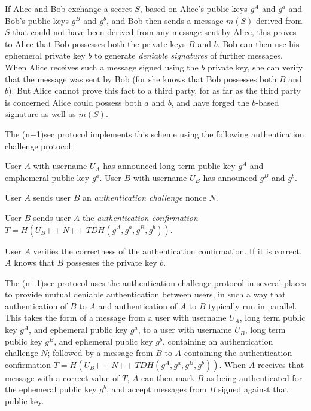 \documentclass{article}
\def\concat{\mathbin{+\!\!\!+}}
\begin{document}
If Alice and Bob exchange a secret $S$, based on Alice's public keys $g^A$ and $g^a$ and Bob's public keys $g^B$ and $g^b$, and Bob then sends a message $m(S)$ derived from $S$ that could not have been derived from any message sent by Alice, this proves to Alice that Bob possesses both the private keys $B$ and $b$.
Bob can then use his ephemeral private key $b$ to generate \emph{deniable signatures} of further messages.
When Alice receives such a message signed using the $b$ private key, she can verify that the message was sent by Bob (for she knows that Bob possesses both $B$ and $b$).
But Alice cannot prove this fact to a third party, for as far as the third party is concerned Alice could possess both $a$ and $b$, and have forged the $b$-based signature as well as $m(S)$.

The (n+1)sec protocol implements this scheme using the following authentication challenge protocol:
\begin{description}[noitemsep]
\item[Participants.] User $A$ with username $U_A$ has announced long term public key $g^A$ and emphemeral public key $g^a$. User $B$ with username $U_B$ has announced $g^B$ and $g^b$.
\item[Round 1.] User $A$ sends user $B$ an \emph{authentication challenge} nonce $N$.
\item[Round 2.] User $B$ sends user $A$ the \emph{authentication confirmation} $T = H(U_B \concat N \concat TDH(g^A, g^a, g^B, g^b))$.
\item[Computation.] User $A$ verifies the correctness of the authentication confirmation. If it is correct, $A$ knows that $B$ possesses the private key $b$.
\end{description}

The (n+1)sec protocol uses the authentication challenge protocol in several places to provide mutual deniable authentication between users, in such a way that authentication of $B$ to $A$ and authentication of $A$ to $B$ typically run in parallel.
This takes the form of a message from a user with username $U_A$, long term public key $g^A$, and ephemeral public key $g^a$, to a user with username $U_B$, long term public key $g^B$, and ephemeral public key $g^b$, containing an authentication challenge $N$; followed by a message from $B$ to $A$ containing the authentication confirmation $T = H(U_B \concat N \concat TDH(g^A, g^a, g^B, g^b))$.
When $A$ receives that message with a correct value of $T$, $A$ can then mark $B$ as being authenticated for the ephemeral public key $g^b$, and accept messages from $B$ signed against that public key.
\end{document}
